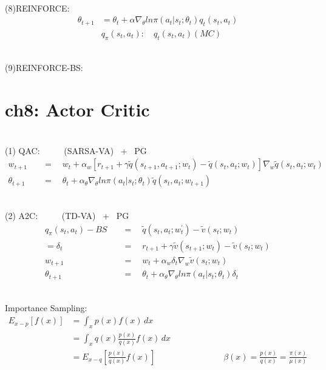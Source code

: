 \documentclass{article}
\begin{document}
~ \\[3pt]
(8)REINFORCE: 
\begin{align*}
    \theta_{t+1} &= \theta_{t} + \alpha \nabla_{\theta} 
                    ln \pi (a_{t} | s_{t}; \theta_{t}) q_{t} (s_{t}, a_{t}) \\[3pt]
    & q_{\pi} (s_{t}, a_{t}) : \quad q_{t} (s_{t}, a_{t}) (MC) 
\end{align*}


~ \\[3pt]
(9)REINFORCE-BS: 


\newpage
\section*{ch8: Actor Critic}


~ \\[3pt]
(1) QAC: \ \ \ \ \ {(SARSA-VA) \ + \ PG} 
\begin{align*}
    w_{t+1} & 
            \quad = \quad w_{t} + \alpha_{w} 
            [ r_{t+1} + \gamma \tilde{q}(s_{t+1}, a_{t+1}; w_{t}) 
            - \tilde{q}(s_{t}, a_{t}; w_{t}) ] 
            \nabla_{w} \tilde{q}(s_{t}, a_{t}; w_{t}) \\[3pt]
    \theta_{t+1} & 
            \quad = \quad \theta_{t} + \alpha_{\theta} \nabla_{\theta} 
            ln \pi (a_{t} | s_{t}; \theta_{t}) \tilde{q}(s_{t}, a_{t}; w_{t+1}) 
\end{align*}


~ \\[3pt]
(2) A2C: \ \ \ \ \ {(TD-VA) \ + \ PG} 
\begin{align*}
    q_{\pi}(s_{t}, a_{t}) - BS & 
            \quad = \quad 
            \tilde{q}(s_{t}, a_{t}; w_{t}^{'}) 
            - \tilde{v}(s_{t}; w_{t}) \\[3pt]
    = \delta_{t} & 
            \quad = \quad 
            r_{t+1} + \gamma \tilde{v}(s_{t+1}; w_{t}) 
            - \tilde{v}(s_{t}; w_{t}) \\[3pt]
    w_{t+1} & 
            \quad = \quad w_{t} + \alpha_{w} \delta_{t} 
            \nabla_{w} \tilde{v}(s_{t}; w_{t}) \\[3pt]
    \theta_{t+1} & 
            \quad = \quad \theta_{t} + \alpha_{\theta} \nabla_{\theta} 
            ln \pi (a_{t} | s_{t}; \theta_{t}) \delta_{t} 
\end{align*}


~ \\[3pt]
Importance Sampling: 
\begin{align*}
    E_{x-p} [f(x)] &= \int_{x} p(x) f(x) \,dx \\[3pt]
                   &= \int_{x} q(x) \frac{p(x)}{q(x)} f(x) \,dx \\[3pt]
                   &= E_{x-q} \left[ \frac{p(x)}{q(x)} f(x) \right] 
                   \qquad \qquad \qquad \qquad 
                   \beta(x) = \frac{p(x)}{q(x)} = \frac{\pi(x)}{\mu(x)} 
\end{align*}
\end{document}
